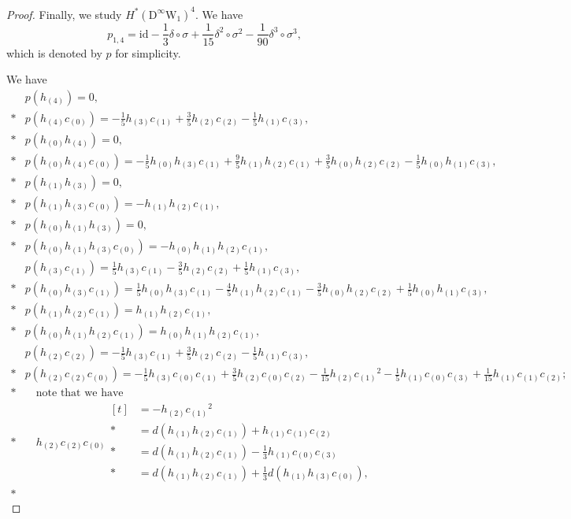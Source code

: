 \documentclass[10pt,a4paper]{amsart}
\newcommand{\D}{\mathrm{D}}
\newcommand{\W}{\mathrm{W}}
\newcommand{\id}{{\mathrm{id}}}
\begin{document}
\begin{proof}
Finally, we study $H^*(\D^\infty\W_1)^4$.
We have
\[
p_{1,4}=\id-\frac13\delta\circ\sigma+\frac1{15}\delta^2\circ\sigma^2-\frac1{90}\delta^3\circ\sigma^3,
\]
which is denoted by $p$ for simplicity.

We have
\begin{align*}
&p(h_{(4)})=0,\\*
&p(h_{(4)}c_{(0)})=-\frac15h_{(3)}c_{(1)}+\frac35h_{(2)}c_{(2)}-\frac15h_{(1)}c_{(3)},\\*
&p(h_{(0)}h_{(4)})=0,\\*
&p(h_{(0)}h_{(4)}c_{(0)})=-\frac15h_{(0)}h_{(3)}c_{(1)}+\frac95h_{(1)}h_{(2)}c_{(1)}+\frac35h_{(0)}h_{(2)}c_{(2)}-\frac15h_{(0)}h_{(1)}c_{(3)},\\*
&p(h_{(1)}h_{(3)})=0,\\*
&p(h_{(1)}h_{(3)}c_{(0)})=-h_{(1)}h_{(2)}c_{(1)},\\*
&p(h_{(0)}h_{(1)}h_{(3)})=0,\\*
&p(h_{(0)}h_{(1)}h_{(3)}c_{(0)})=-h_{(0)}h_{(1)}h_{(2)}c_{(1)},\\
&p(h_{(3)}c_{(1)})=\frac15h_{(3)}c_{(1)}-\frac35h_{(2)}c_{(2)}+\frac15h_{(1)}c_{(3)},\\*
&p(h_{(0)}h_{(3)}c_{(1)})=\frac15h_{(0)}h_{(3)}c_{(1)}-\frac45h_{(1)}h_{(2)}c_{(1)}-\frac35h_{(0)}h_{(2)}c_{(2)}+\frac15h_{(0)}h_{(1)}c_{(3)},\\*
&p(h_{(1)}h_{(2)}c_{(1)})=h_{(1)}h_{(2)}c_{(1)},\\*
&p(h_{(0)}h_{(1)}h_{(2)}c_{(1)})=h_{(0)}h_{(1)}h_{(2)}c_{(1)},\\
&p(h_{(2)}c_{(2)})=-\frac15h_{(3)}c_{(1)}+\frac35h_{(2)}c_{(2)}-\frac15h_{(1)}c_{(3)},\\*
&p(h_{(2)}c_{(2)}c_{(0)})=-\frac15h_{(3)}c_{(0)}c_{(1)}+\frac35h_{(2)}c_{(0)}c_{(2)}-\frac1{15}h_{(2)}c_{(1)}{}^2-\frac15h_{(1)}c_{(0)}c_{(3)}+\frac1{15}h_{(1)}c_{(1)}c_{(2)};\\*
&\quad\text{note that we have}\\*
&\quad h_{(2)}c_{(2)}c_{(0)}\begin{aligned}[t]
&=-h_{(2)}c_{(1)}{}^2\\*
&=d(h_{(1)}h_{(2)}c_{(1)})+h_{(1)}c_{(1)}c_{(2)}\\*
&=d(h_{(1)}h_{(2)}c_{(1)})-\frac13h_{(1)}c_{(0)}c_{(3)}\\*
&=d(h_{(1)}h_{(2)}c_{(1)})+\frac13d(h_{(1)}h_{(3)}c_{(0)}),
\end{aligned}\\*

\end{align*}
\end{proof}
\end{document}
